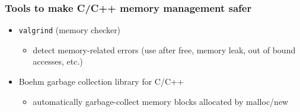 \documentclass[12pt,dvipdfmx]{beamer}
\newif\ifja
\newif\ifeng
\newcommand{\ao}[1]{{\color{blue}#1}}
\begin{document}
\begin{frame}
  \frametitle{Tools to make C/C++ memory management safer}
  \begin{itemize}
  \item \ao{\tt valgrind} (memory checker)
    \begin{itemize}
    \item detect memory-related errors (use after free, memory leak, out of bound accesses, etc.)
    \end{itemize}
  \item Boehm garbage collection library for C/C++
    \begin{itemize}
    \item automatically garbage-collect memory blocks allocated by malloc/new
    \end{itemize}
  \end{itemize}
\end{frame}


\fi


\iffalse
\ifja
\begin{frame}[fragile]
\frametitle{起きうる間違い}
\begin{itemize}
\item 寿命を超えて変数をアクセスする
\item ヒープから割り当てた変数を開放し忘れる\ao{(メモリリーク)}
\end{itemize}
\end{frame}
\fi
\ifeng
\begin{frame}[fragile]
\frametitle{How they can go wrong}
\begin{itemize}
\item access an object beyond its lifetime 
\item forget to release/reclaim
  an object \ao{(memory leak)}
\end{itemize}
\end{frame}
\fi
\fi
\end{document}
